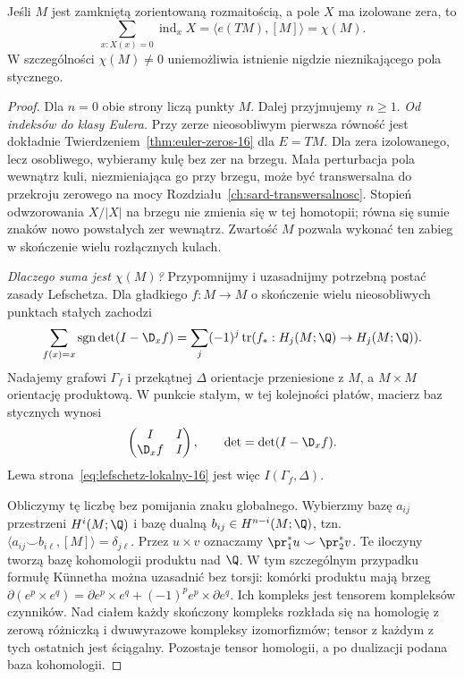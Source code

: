 \begin{twierdzenie}
\label{thm:poincare-hopf-16}
Jeśli $M$ jest
zamkniętą
zorientowaną rozmaitością,
a pole $X$ ma
izolowane zera, to
\begin{equation}\label{eq:poincare-hopf-16}
 \sum_{x:X(x)=0}
     \operatorname{ind}_x X
 =\langle e(TM),[M]\rangle
 =\chi(M).
\end{equation}
W szczególności
$\chi(M)\ne0$
uniemożliwia istnienie
nigdzie nieznikającego
pola stycznego.
\end{twierdzenie}
\begin{proof}
Dla $n=0$ obie strony liczą punkty $M$.
Dalej przyjmujemy $n\geq1$.
\emph{Od indeksów do klasy Eulera.}
Przy zerze nieosobliwym
pierwsza równość jest
dokładnie
Twierdzeniem~\ref{thm:euler-zeros-16}
dla $E=TM$. Dla zera
izolowanego, lecz
osobliwego, wybieramy
kulę bez zer na
brzegu. Mała perturbacja
pola wewnątrz kuli,
niezmieniająca go
przy brzegu, może być
transwersalna do
przekroju zerowego
na mocy
Rozdziału~\ref{ch:sard-transwersalnosc}.
Stopień odwzorowania
$X/|X|$ na brzegu
nie zmienia się
w tej homotopii;
równa się sumie
znaków nowo
powstałych zer
wewnątrz. Zwartość
$M$ pozwala wykonać
ten zabieg w
skończenie wielu
rozłącznych kulach.

\emph{Dlaczego suma jest $\chi(M)$?}
Przypomnijmy i uzasadnijmy
potrzebną postać
zasady Lefschetza.
Dla gładkiego
$f:M\to M$ o
skończenie wielu
nieosobliwych
punktach stałych
zachodzi
\begin{equation}\label{eq:lefschetz-lokalny-16}
 \sum_{f(x)=x}
    \operatorname{sgn}\det(I-\D_xf)
 =\sum_j(-1)^j
    \operatorname{tr}
      (f_*:H_j(M;\Q)\to H_j(M;\Q)).
\end{equation}
Nadajemy grafowi $\Gamma_f$ i przekątnej $\Delta$
orientacje przeniesione z $M$, a $M\times M$ orientację
produktową. W punkcie stałym, w tej kolejności płatów,
macierz baz stycznych wynosi
\[
 \begin{pmatrix}I&I\\\D_xf&I\end{pmatrix},
 \qquad \det=\det(I-\D_xf).
\]
Lewa strona~\eqref{eq:lefschetz-lokalny-16}
jest więc $I(\Gamma_f,\Delta)$.

Obliczymy tę liczbę bez pomijania znaku globalnego.
Wybierzmy bazę $a_{ij}$ przestrzeni $H^i(M;\Q)$
i bazę dualną $b_{ij}\in H^{n-i}(M;\Q)$, tzn.
$\langle a_{ij}\smile b_{i\ell},[M]\rangle=\delta_{j\ell}$.
Przez $u\times v$ oznaczamy
$\pr_1^*u\smile\pr_2^*v$. Te iloczyny tworzą bazę
kohomologii produktu nad $\Q$. W tym szczególnym
przypadku formułę Künnetha można uzasadnić bez torsji:
komórki produktu mają brzeg
$\partial(e^p\times e^q)=\partial e^p\times e^q+
(-1)^p e^p\times\partial e^q$.
Ich kompleks jest tensorem kompleksów czynników.
Nad ciałem każdy skończony kompleks rozkłada się na
homologię z zerową różniczką i dwuwyrazowe kompleksy
izomorfizmów; tensor z każdym z tych ostatnich
jest ściągalny. Pozostaje tensor homologii,
a po dualizacji podana baza kohomologii.


\end{proof}
